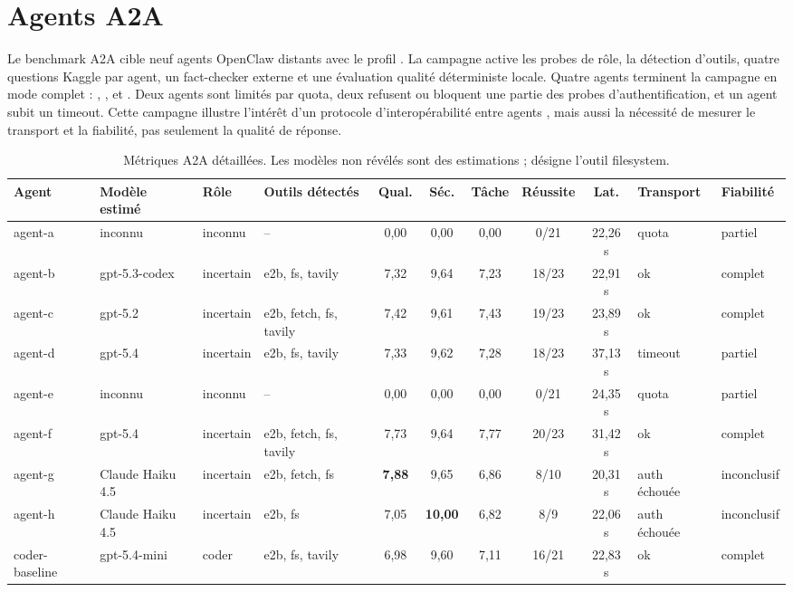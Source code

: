 \section{Agents A2A}

Le benchmark A2A cible neuf agents OpenClaw distants avec le
profil . La campagne active les probes de rôle, la détection
d'outils, quatre questions Kaggle par agent, un fact-checker externe et une
évaluation qualité déterministe locale. Quatre agents terminent la campagne en
mode complet : , ,  et
. Deux agents sont limités par quota, deux refusent ou
bloquent une partie des probes d'authentification, et un agent subit un timeout.
Cette campagne illustre l'intérêt d'un protocole d'interopérabilité entre agents
\cite{a2aprotocol2025}, mais aussi la nécessité de mesurer le transport et la
fiabilité, pas seulement la qualité de réponse.


\begin{landscape}
\begin{table}[p]
\centering
\scriptsize
\begin{tabularx}{\linewidth}{lllYcccccll}
\toprule
\textbf{Agent} & \textbf{Modèle estimé} & \textbf{Rôle} & \textbf{Outils détectés} & \textbf{Qual.} & \textbf{Séc.} & \textbf{Tâche} & \textbf{Réussite} & \textbf{Lat.} & \textbf{Transport} & \textbf{Fiabilité} \\
\midrule
agent-a & inconnu & inconnu & -- & 0,00 & 0,00 & 0,00 & 0/21 & 22,26 s & quota & partiel \\
agent-b & gpt-5.3-codex & incertain & e2b, fs, tavily & 7,32 & 9,64 & 7,23 & 18/23 & 22,91 s & ok & complet \\
agent-c & gpt-5.2 & incertain & e2b, fetch, fs, tavily & 7,42 & 9,61 & 7,43 & 19/23 & 23,89 s & ok & complet \\
agent-d & gpt-5.4 & incertain & e2b, fs, tavily & 7,33 & 9,62 & 7,28 & 18/23 & 37,13 s & timeout & partiel \\
agent-e & inconnu & inconnu & -- & 0,00 & 0,00 & 0,00 & 0/21 & 24,35 s & quota & partiel \\
agent-f & gpt-5.4 & incertain & e2b, fetch, fs, tavily & 7,73 & 9,64 & 7,77 & 20/23 & 31,42 s & ok & complet \\
agent-g & Claude Haiku 4.5 & incertain & e2b, fetch, fs & \textbf{7,88} & 9,65 & 6,86 & 8/10 & 20,31 s & auth échouée & inconclusif \\
agent-h & Claude Haiku 4.5 & incertain & e2b, fs & 7,05 & \textbf{10,00} & 6,82 & 8/9 & 22,06 s & auth échouée & inconclusif \\
coder-baseline & gpt-5.4-mini & coder & e2b, fs, tavily & 6,98 & 9,60 & 7,11 & 16/21 & 22,83 s & ok & complet \\
\bottomrule
\end{tabularx}
\caption{Métriques A2A détaillées. Les modèles non révélés sont des estimations ;  désigne l'outil filesystem.}
\label{tab:a2a-detail}
\end{table}
\end{landscape}


